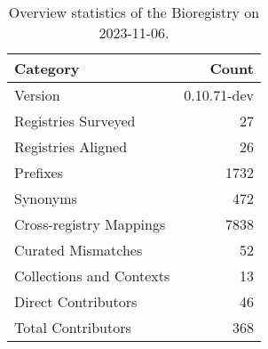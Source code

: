 \begin{table}
\caption{Overview statistics of the Bioregistry on 2023-11-06.}
\label{tab:bioregistry-summary}
\begin{tabular}{lr}
\toprule
Category & Count \\
\midrule
Version & 0.10.71-dev \\
Registries Surveyed & 27 \\
Registries Aligned & 26 \\
Prefixes & 1732 \\
Synonyms & 472 \\
Cross-registry Mappings & 7838 \\
Curated Mismatches & 52 \\
Collections and Contexts & 13 \\
Direct Contributors & 46 \\
Total Contributors & 368 \\
\bottomrule
\end{tabular}
\end{table}
